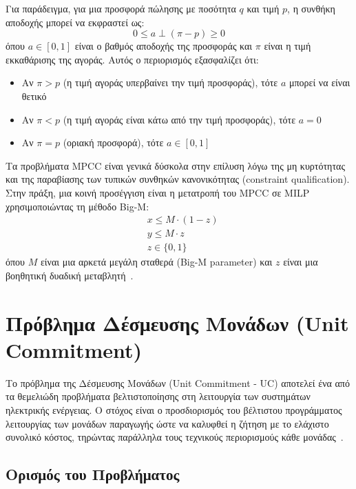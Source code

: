 Για παράδειγμα, για μια προσφορά πώλησης με ποσότητα $q$ και τιμή $p$, η συνθήκη αποδοχής μπορεί να εκφραστεί ως:
\begin{equation}
\label{eq:mpcc-bid-acceptance}
0 \leq a \perp (\pi - p) \geq 0
\end{equation}
όπου $a \in [0, 1]$ είναι ο βαθμός αποδοχής της προσφοράς και $\pi$ είναι η τιμή εκκαθάρισης της αγοράς. Αυτός ο περιορισμός εξασφαλίζει ότι:
\begin{itemize}
    \item Αν $\pi > p$ (η τιμή αγοράς υπερβαίνει την τιμή προσφοράς), τότε $a$ μπορεί να είναι θετικό
    \item Αν $\pi < p$ (η τιμή αγοράς είναι κάτω από την τιμή προσφοράς), τότε $a = 0$
    \item Αν $\pi = p$ (οριακή προσφορά), τότε $a \in [0, 1]$
\end{itemize}

Τα προβλήματα MPCC είναι γενικά δύσκολα στην επίλυση λόγω της μη κυρτότητας και της παραβίασης των τυπικών συνθηκών κανονικότητας (constraint qualification). Στην πράξη, μια κοινή προσέγγιση είναι η μετατροπή του MPCC σε MILP χρησιμοποιώντας τη μέθοδο Big-M:
\begin{equation}
\label{eq:big-m-complementarity}
\begin{aligned}
& x \leq M \cdot (1 - z) \\
& y \leq M \cdot z \\
& z \in \{0, 1\}
\end{aligned}
\end{equation}
όπου $M$ είναι μια αρκετά μεγάλη σταθερά (Big-M parameter) και $z$ είναι μια βοηθητική δυαδική μεταβλητή~\cite{gabriel2013}.


\section{Πρόβλημα Δέσμευσης Μονάδων (Unit Commitment)}
\label{sec:unit-commitment}

Το πρόβλημα της Δέσμευσης Μονάδων (Unit Commitment - UC) αποτελεί ένα από τα θεμελιώδη προβλήματα βελτιστοποίησης στη λειτουργία των συστημάτων ηλεκτρικής ενέργειας. Ο στόχος είναι ο προσδιορισμός του βέλτιστου προγράμματος λειτουργίας των μονάδων παραγωγής ώστε να καλυφθεί η ζήτηση με το ελάχιστο συνολικό κόστος, τηρώντας παράλληλα τους τεχνικούς περιορισμούς κάθε μονάδας~\cite{padhy2004}.

\subsection{Ορισμός του Προβλήματος}
\label{subsec:uc-definition}

